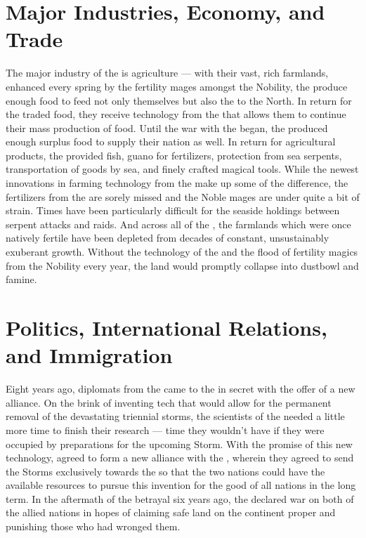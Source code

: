 \documentclass[blue]{GL2020}
\begin{document}
\section*{Major Industries, Economy, and Trade}
The major industry of the \pFarm{} is agriculture — with their vast, rich farmlands, enhanced every spring by the fertility mages amongst the Nobility, the \pFarmers{} produce enough food to feed not only themselves but also the \pTech{} to the North. In return for the traded food, they receive technology from the \pTech{} that allows them to continue their mass production of food.  Until the war with the \pShippies{} began, the \pFarm{} produced enough surplus food to supply their nation as well. In return for agricultural products, the \pShippies{} provided fish, guano for fertilizers, protection from sea serpents, transportation of goods by sea, and finely crafted magical tools. While the newest innovations in farming technology from the \pTech{} make up some of the difference, the fertilizers from the \pShip{} are sorely missed and the Noble mages are under quite a bit of strain. Times have been particularly difficult for the seaside holdings between serpent attacks and \pShip{} raids. And across all of the \pFarm{}, the farmlands which were once natively fertile have been depleted from decades of constant, unsustainably exuberant growth. Without the technology of the \pTech{} and the flood of fertility magics from the Nobility every year, the land would promptly collapse into dustbowl and famine.

\section*{Politics, International Relations, and Immigration}
Eight years ago, diplomats from the \pTech{} came to the \pFarm{} in secret with the offer of a new alliance. On the brink of inventing tech that would allow for the permanent removal of the devastating triennial storms, the scientists of the \pTech{} needed a little more time to finish their research — time they wouldn’t have if they were occupied by preparations for the upcoming Storm. With the promise of this new technology, \cQueen{\Majesty} \cQueen{} agreed to form a new alliance with the \pTech{}, wherein they agreed to send the Storms exclusively towards the \pShip{} so that the two nations could have the available resources to pursue this invention for the good of all nations in the long term. In the aftermath of the betrayal six years ago, the \pShip{} declared war on both of the allied nations in hopes of claiming safe land on the continent proper and punishing those who had wronged them.
\end{document}
